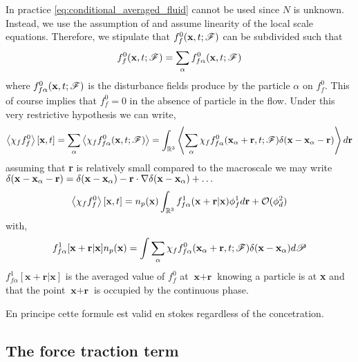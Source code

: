In practice \ref{eq:conditional_averaged_fluid} cannot be used since $N$ is unknown. 
Instead, we use the assumption of \citet{batchelor1972sedimentation} and assume linearity of the local scale equations. 
Therefore, we stipulate that $f_f^0(\textbf{x},t;\mathscr{F})$ can be subdivided such that  
\begin{equation}
    f_f^0(\textbf{x},t;\mathscr{F})
    = 
    \sum_\alpha
    f_{f\alpha}^0(\textbf{x},t;\mathscr{F})
\end{equation}
where $f_{f\alpha}^0(\textbf{x},t;\mathscr{F})$ is the disturbance fields produce by the particle $\alpha$ on $f_f^0$. 
This of course implies that $f_f^0 = 0$ in the absence of particle in the flow. 
Under this very restrictive hypothesis we can write, 
\begin{equation}
    \left<\chi_ff_f^0\right>[\textbf{x},t]
    = 
    \sum_\alpha
    \left<\chi_f f_{f\alpha}^0(\textbf{x},t;\mathscr{F})\right>
    = 
    \int_{\mathbb{R}^3} 
    \left<
        \sum_\alpha
    \chi_f f_{f\alpha}^0(\textbf{x}_\alpha + \textbf{r},t;\mathscr{F}) \delta(\textbf{x} - \textbf{x}_\alpha - \textbf{r})\right>d\textbf{r}
\end{equation}
assuming that \textbf{r} is relatively small compared to the macroscale we may write $\delta(\textbf{x} - \textbf{x}_\alpha - \textbf{r}) =\delta(\textbf{x} - \textbf{x}_\alpha) - \textbf{r}\cdot \mathbf{\nabla}\delta(\textbf{x} - \textbf{x}_\alpha)+ \ldots$
\begin{equation}
    \left<\chi_ff_f^0\right>[\textbf{x},t]
    = 
    n_p(\textbf{x}) 
    \int_{\mathbb{R}^3} 
    f_{f\alpha}^1(\textbf{x}+ \textbf{r}| \textbf{x})
    \phi_f^1
    d\textbf{r}
    + \mathcal{O}(\phi_d^2)
\end{equation}
with, 
\begin{equation*}
    f_{f\alpha}^1[\textbf{x}+ \textbf{r}| \textbf{x}]n_p(\textbf{x}) 
    = 
    \int{
    \sum_\alpha
    \chi_f f_{f\alpha}^0(\textbf{x}_\alpha + \textbf{r},t;\mathscr{F}) \delta(\textbf{x} - \textbf{x}_\alpha)
    }d\mathscr{P}
\end{equation*}
$f_{f\alpha}^1[\textbf{x}+ \textbf{r}| \textbf{x}]$ is the averaged value of $f_f^0$ at $\textbf{x}+\textbf{r}$ knowing a particle is at \textbf{x} and that the point $\textbf{x}+\textbf{r}$ is occupied by the continuous phase. 

En principe cette formule est valid en stokes regardless of the concetration. 

\subsection{The force traction term}

